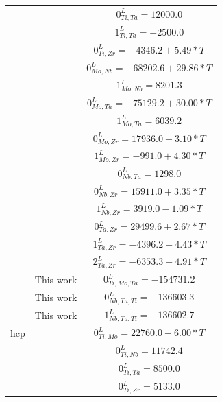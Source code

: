 \begin{longtable}[H]{ c c c }
                  & \cite{Ansara1998} & $0^\textit{L}_{Ti,Ta} = 12000.0$\\
                  & \cite{Ansara1998} & $1^\textit{L}_{Ti,Ta} = -2500.0$\\
                  & \cite{Kumar1994a} & $0^\textit{L}_{Ti,Zr} = -4346.2+5.49*T$\\
                  & \cite{Xiong2004} & $0^\textit{L}_{Mo,Nb} = -68202.6+29.86*T$\\
                  & \cite{Xiong2004} & $1^\textit{L}_{Mo,Nb} = 8201.3$\\
                  & \cite{Xiong2004} & $0^\textit{L}_{Mo,Ta} = -75129.2+30.00*T$\\
                  & \cite{Xiong2004} & $1^\textit{L}_{Mo,Ta} = 6039.2$\\
                  & \cite{Perez2003} & $0^\textit{L}_{Mo,Zr} = 17936.0+3.10*T$\\
                  & \cite{Perez2003} & $1^\textit{L}_{Mo,Zr} = -991.0+4.30*T$\\
                  & \cite{Xiong2004} & $0^\textit{L}_{Nb,Ta} = 1298.0$\\
                  & \cite{Guillermet1991} & $0^\textit{L}_{Nb,Zr} = 15911.0+3.35*T$\\
                  & \cite{Guillermet1991} & $1^\textit{L}_{Nb,Zr} = 3919.0-1.09*T$\\
                  & \cite{Guillermet1995} & $0^\textit{L}_{Ta,Zr} = 29499.6+2.67*T$\\
                  & \cite{Guillermet1995} & $1^\textit{L}_{Ta,Zr} = -4396.2+4.43*T$\\
                  & \cite{Guillermet1995} & $2^\textit{L}_{Ta,Zr} = -6353.3+4.91*T$\\
                  & This work & $0^\textit{L}_{Ti,Mo,Ta} = -154731.2$\\
                  & This work & $0^\textit{L}_{Nb,Ta,Ti} = -136603.3$\\
                  & This work & $1^\textit{L}_{Nb,Ta,Ti} = -136602.7$\\
          hcp & \cite{Ansara1998} & $0^\textit{L}_{Ti,Mo} = 22760.0-6.00*T$\\      
                  & \cite{Zhang2001} & $0^\textit{L}_{Ti,Nb} = 11742.4$\\
                  & \cite{Ansara1998} & $0^\textit{L}_{Ti,Ta} = 8500.0$\\
                  & \cite{Kumar1994a} & $0^\textit{L}_{Ti,Zr} = 5133.0$\\

\end{longtable}
